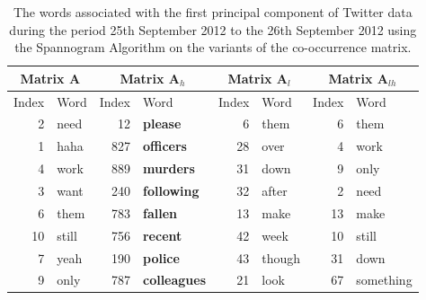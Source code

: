 \documentclass[graybox]{svmult}
\newcommand{\covmat}{\mathbf{A}}
\begin{document}
\begin{table}[H]
\center
\begin{tabular}{| r | l | r | l| r | l | r | l|}
\hline
\multicolumn{2}{|c|}{Matrix $\covmat$ }& \multicolumn{2}{|c|}{Matrix $\covmat_h$}& \multicolumn{2}{|c|}{Matrix $\covmat_l$} & \multicolumn{2}{|c|}{Matrix $\covmat_{lh}$} \\

\hline
Index & Word &Index & Word & Index & Word & Index & Word\\
\hline
2 & need & 12 & \textbf{please}  & 6 & them & 6 & them\\
1 & haha & 827 & \textbf{officers}  &28 & over &  4 & work\\
4 & work &889 & \textbf{murders} & 31 & down& 9 & only \\

3 & want & 240 & \textbf{following} &32 & after & 2 & need \\

6 & them & 783 & \textbf{fallen}&13 & make  & 13 & make\\

10 & still & 756 & \textbf{recent} &42 & week & 10 & still  \\ 

7 & yeah&190 & \textbf{police}  & 43 & though & 31 & down\\
 
9 & only & 787 & \textbf{colleagues} & 21 & look & 67 & something \\


\hline
\end{tabular}
\caption{The words associated with the first principal component of Twitter data during the period 25th September 2012 to the 26th September 2012 using the Spannogram Algorithm on the variants of the co-occurrence matrix.}
\label{pcs_police}
\end{table}
\end{document}

